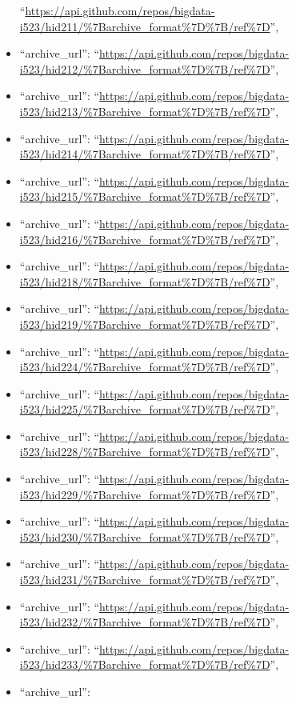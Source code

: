 \begin{itemize}
  ``\url{https://api.github.com/repos/bigdata-i523/hid211/\%7Barchive_format\%7D\%7B/ref\%7D}'',
\item
  ``archive\_url'':
  ``\url{https://api.github.com/repos/bigdata-i523/hid212/\%7Barchive_format\%7D\%7B/ref\%7D}'',
\item
  ``archive\_url'':
  ``\url{https://api.github.com/repos/bigdata-i523/hid213/\%7Barchive_format\%7D\%7B/ref\%7D}'',
\item
  ``archive\_url'':
  ``\url{https://api.github.com/repos/bigdata-i523/hid214/\%7Barchive_format\%7D\%7B/ref\%7D}'',
\item
  ``archive\_url'':
  ``\url{https://api.github.com/repos/bigdata-i523/hid215/\%7Barchive_format\%7D\%7B/ref\%7D}'',
\item
  ``archive\_url'':
  ``\url{https://api.github.com/repos/bigdata-i523/hid216/\%7Barchive_format\%7D\%7B/ref\%7D}'',
\item
  ``archive\_url'':
  ``\url{https://api.github.com/repos/bigdata-i523/hid218/\%7Barchive_format\%7D\%7B/ref\%7D}'',
\item
  ``archive\_url'':
  ``\url{https://api.github.com/repos/bigdata-i523/hid219/\%7Barchive_format\%7D\%7B/ref\%7D}'',
\item
  ``archive\_url'':
  ``\url{https://api.github.com/repos/bigdata-i523/hid224/\%7Barchive_format\%7D\%7B/ref\%7D}'',
\item
  ``archive\_url'':
  ``\url{https://api.github.com/repos/bigdata-i523/hid225/\%7Barchive_format\%7D\%7B/ref\%7D}'',
\item
  ``archive\_url'':
  ``\url{https://api.github.com/repos/bigdata-i523/hid228/\%7Barchive_format\%7D\%7B/ref\%7D}'',
\item
  ``archive\_url'':
  ``\url{https://api.github.com/repos/bigdata-i523/hid229/\%7Barchive_format\%7D\%7B/ref\%7D}'',
\item
  ``archive\_url'':
  ``\url{https://api.github.com/repos/bigdata-i523/hid230/\%7Barchive_format\%7D\%7B/ref\%7D}'',
\item
  ``archive\_url'':
  ``\url{https://api.github.com/repos/bigdata-i523/hid231/\%7Barchive_format\%7D\%7B/ref\%7D}'',
\item
  ``archive\_url'':
  ``\url{https://api.github.com/repos/bigdata-i523/hid232/\%7Barchive_format\%7D\%7B/ref\%7D}'',
\item
  ``archive\_url'':
  ``\url{https://api.github.com/repos/bigdata-i523/hid233/\%7Barchive_format\%7D\%7B/ref\%7D}'',
\item
  ``archive\_url'':

\end{itemize}
